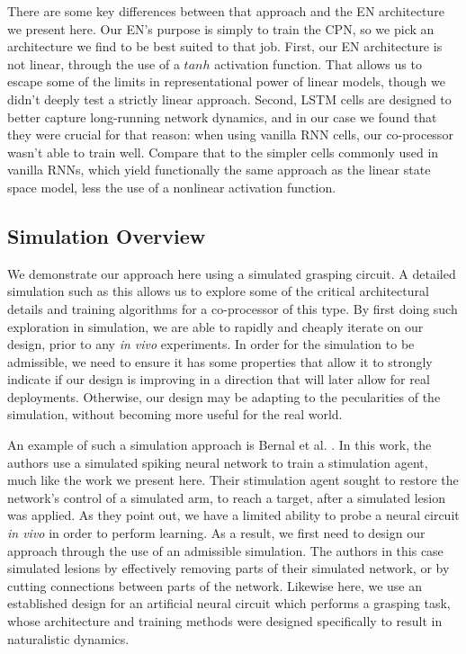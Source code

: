 \documentclass[12pt]{iopart}
\begin{document}
There are some key differences between that approach and the EN architecture we
present here. Our EN's purpose is simply to train the CPN, so we pick an
architecture we find to be best suited to that job. First, our EN architecture
is not linear, through the use of a $tanh$ activation function. That allows us
to escape some of the limits in representational power of linear models, though
we didn't deeply test a strictly linear approach.
Second, LSTM cells are designed to better capture long-running network
dynamics, and in our case we found that they were crucial for that reason:
when using vanilla RNN cells, our co-processor wasn't able to train well.
Compare that to the simpler cells commonly used in vanilla RNNs, which
yield functionally the same approach as the linear state space model, less
the use of a nonlinear activation function.

\subsection{Simulation Overview}
We demonstrate our approach here using a simulated grasping circuit.
A detailed simulation such as this allows us to explore some of the critical
architectural details and training algorithms for a co-processor of this type.
By first doing such exploration in simulation, we are able to rapidly and
cheaply iterate on our design, prior to any \textit{in vivo} experiments.
In order for the simulation to be admissible, we need to ensure it has some
properties that allow it to strongly indicate if our design is improving in
a direction that will later allow for real deployments. Otherwise, our
design may be adapting to the pecularities of the simulation, without
becoming more useful for the real world.

An example of such a simulation approach is Bernal et al. \cite{bernal.sim}. In this work, the
authors use a simulated spiking neural network to train a stimulation agent, much
like the work we present here. Their stimulation agent sought to restore the network's
control of a simulated arm, to reach a target, after a simulated lesion was applied.
As they point out, we have a limited ability to probe a neural circuit \textit{in vivo}
in order to perform learning. As a result, we first need to design our approach through
the use of an admissible simulation. The authors in this case simulated lesions by
effectively removing parts of their simulated network, or by cutting connections between
parts of the network. Likewise here, we use an established design for an artificial
neural circuit which performs a grasping task, whose architecture and training methods
were designed specifically to result in naturalistic dynamics.
\end{document}
